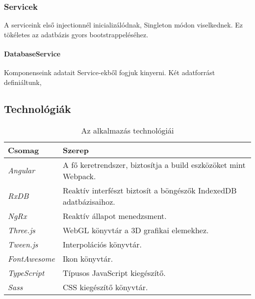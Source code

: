 \subsubsection{Servicek}

A serviceink első injectionnél inicializálódnak, Singleton \cite{Singleton} módon viselkednek. Ez tökéletes az adatbázis gyors bootstrappeléséhez.

\paragraph{DatabaseService}

Komponenseink adatait Service-ekből fogjuk kinyerni. Két adatforrást definiáltunk,







































\subsection{Technológiák}

\begin{table}[H]
	\centering
	\begin{tabular}{ | m{} | m{} | }
		\hline
		\textbf{Csomag} & \textbf{Szerep} \\
		\hline \hline
		\emph{Angular} \cite{Angular} & A fő keretrendszer, biztosítja a build eszközöket mint Webpack. \\
		\hline
		\emph{RxDB} \cite{RxDB} & Reaktív interfészt biztosít a böngészők IndexedDB adatbázisaihoz. \\
		\hline
		\emph{NgRx} \cite{NgRx} & Reaktív állapot menedzsment. \\
		\hline
		\emph{Three.js} \cite{Three} & WebGL könyvtár a 3D grafikai elemekhez. \\
		\hline
		\emph{Tween.js} \cite{Tween} & Interpolációs könyvtár. \\
		\hline
		\emph{FontAwesome} \cite{FontAwesome} & Ikon könyvtár.  \\
		\hline
		\emph{TypeScript} \cite{TypeScript} & Típusos JavaScript kiegészítő.  \\
		\hline

		\emph{Sass} \cite{Sass} & CSS kiegészítő könyvtár.  \\
		\hline
	\end{tabular}
	\caption{Az alkalmazás technológiái}
	\label{tab:technologies}
\end{table}

